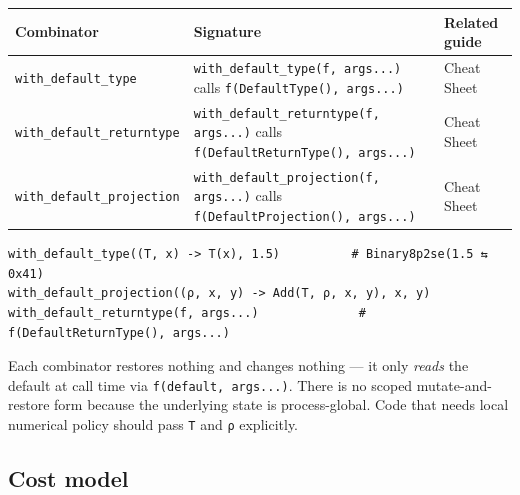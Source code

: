\label{5124425984651407666}{}



\begin{table}[h]
\centering
\begin{tabulary}{\linewidth}{L L L}
\toprule
Combinator & Signature & Related guide \\
\toprule
\texttt{with\_\allowbreak{}default\_\allowbreak{}type} & \texttt{with\_\allowbreak{}default\_\allowbreak{}type(\allowbreak{}f, args...)} calls \texttt{f(\allowbreak{}DefaultType(\allowbreak{}), args...)} & Cheat Sheet \\
\texttt{with\_\allowbreak{}default\_\allowbreak{}returntype} & \texttt{with\_\allowbreak{}default\_\allowbreak{}returntype(\allowbreak{}f, args...)} calls \texttt{f(\allowbreak{}DefaultReturnType(\allowbreak{}), args...)} & Cheat Sheet \\
\texttt{with\_\allowbreak{}default\_\allowbreak{}projection} & \texttt{with\_\allowbreak{}default\_\allowbreak{}projection(\allowbreak{}f, args...)} calls \texttt{f(\allowbreak{}DefaultProjection(\allowbreak{}), args...)} & Cheat Sheet \\
\bottomrule
\end{tabulary}

\end{table}




\begin{verbatim}
with_default_type((T, x) -> T(x), 1.5)          # Binary8p2se(1.5 ⇆ 0x41)
with_default_projection((ρ, x, y) -> Add(T, ρ, x, y), x, y)
with_default_returntype(f, args...)              # f(DefaultReturnType(), args...)
\end{verbatim}



Each combinator restores nothing and changes nothing — it only \emph{reads} the default at call time via \texttt{f(default, args...)}. There is no scoped mutate-and-restore form because the underlying state is process-global. Code that needs local numerical policy should pass \texttt{T} and \texttt{ρ} explicitly.



\subsection{Cost model}



\label{14729244558823917650}{}



